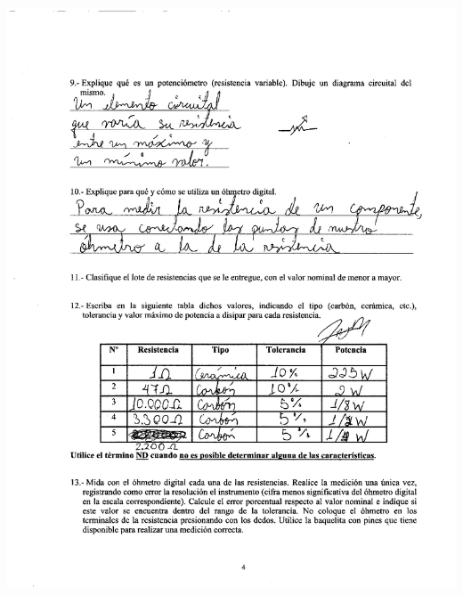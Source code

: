 \documentclass[12pt]{article}
\begin{document}
	\includegraphics[width=15cm,height=20cm]{anexo3}\\
	
\end{document}
